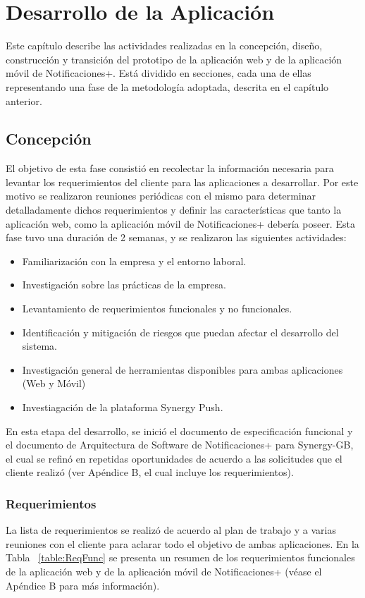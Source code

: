 \chapter{Desarrollo de la Aplicación}\label{chapter:Desarrollo de la Aplicacion}

Este capítulo describe las actividades realizadas en la concepción, diseño, construcción y transición del prototipo de la aplicación web y de la aplicación móvil de Notificaciones+. 
Está dividido en secciones, cada una de ellas representando una fase de la metodología adoptada, descrita en el capítulo anterior.

\section{Concepción} \label{sect:Concepcion}
El objetivo de esta fase consistió en recolectar la información necesaria para levantar los requerimientos del cliente para las aplicaciones a desarrollar. Por este motivo se realizaron reuniones periódicas con el mismo para determinar detalladamente dichos requerimientos y definir las características que tanto la aplicación web, como la aplicación móvil de Notificaciones+ debería poseer.
Esta fase tuvo una duración de 2 semanas, y se realizaron las siguientes actividades:
\smallskip
\begin{itemize}[noitemsep,nolistsep]
  \item Familiarización con la empresa y el entorno laboral.
  \item Investigación sobre las prácticas de la empresa.
  \item Levantamiento de requerimientos funcionales y no funcionales.
  \item Identificación y mitigación de riesgos que puedan afectar el desarrollo del sistema.
  \item Investigación general de herramientas disponibles para ambas aplicaciones (Web y Móvil)
  \item Investiagación de la plataforma Synergy Push.
\end{itemize}
\bigskip

En esta etapa del desarrollo, se inició el documento de especificación funcional y el documento de Arquitectura de Software de Notificaciones+ para Synergy-GB, el cual se refinó en repetidas oportunidades de acuerdo a las solicitudes que el cliente realizó (ver Apéndice B, el cual incluye los requerimientos).

\subsection{Requerimientos}
La lista de requerimientos se realizó de acuerdo al plan de trabajo y a varias reuniones con el cliente para aclarar todo el objetivo de ambas aplicaciones. En la Tabla ~\ref{table:ReqFunc} se presenta un resumen de los requerimientos funcionales de la aplicación web y de la aplicación móvil de Notificaciones+ (véase el Apéndice B para más información).

